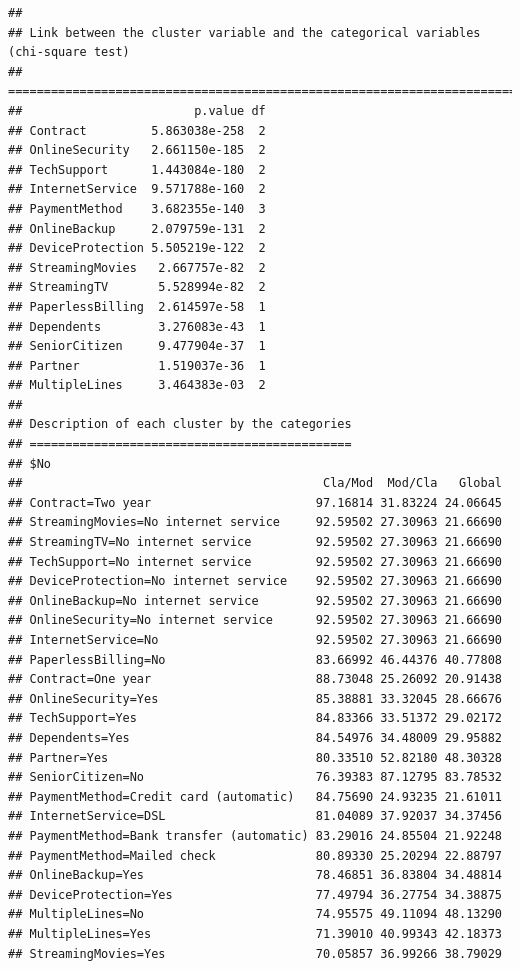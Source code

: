 \documentclass[
]{article}
\begin{document}
\begin{verbatim}
## 
## Link between the cluster variable and the categorical variables (chi-square test)
## =================================================================================
##                        p.value df
## Contract         5.863038e-258  2
## OnlineSecurity   2.661150e-185  2
## TechSupport      1.443084e-180  2
## InternetService  9.571788e-160  2
## PaymentMethod    3.682355e-140  3
## OnlineBackup     2.079759e-131  2
## DeviceProtection 5.505219e-122  2
## StreamingMovies   2.667757e-82  2
## StreamingTV       5.528994e-82  2
## PaperlessBilling  2.614597e-58  1
## Dependents        3.276083e-43  1
## SeniorCitizen     9.477904e-37  1
## Partner           1.519037e-36  1
## MultipleLines     3.464383e-03  2
## 
## Description of each cluster by the categories
## =============================================
## $No
##                                          Cla/Mod  Mod/Cla   Global
## Contract=Two year                       97.16814 31.83224 24.06645
## StreamingMovies=No internet service     92.59502 27.30963 21.66690
## StreamingTV=No internet service         92.59502 27.30963 21.66690
## TechSupport=No internet service         92.59502 27.30963 21.66690
## DeviceProtection=No internet service    92.59502 27.30963 21.66690
## OnlineBackup=No internet service        92.59502 27.30963 21.66690
## OnlineSecurity=No internet service      92.59502 27.30963 21.66690
## InternetService=No                      92.59502 27.30963 21.66690
## PaperlessBilling=No                     83.66992 46.44376 40.77808
## Contract=One year                       88.73048 25.26092 20.91438
## OnlineSecurity=Yes                      85.38881 33.32045 28.66676
## TechSupport=Yes                         84.83366 33.51372 29.02172
## Dependents=Yes                          84.54976 34.48009 29.95882
## Partner=Yes                             80.33510 52.82180 48.30328
## SeniorCitizen=No                        76.39383 87.12795 83.78532
## PaymentMethod=Credit card (automatic)   84.75690 24.93235 21.61011
## InternetService=DSL                     81.04089 37.92037 34.37456
## PaymentMethod=Bank transfer (automatic) 83.29016 24.85504 21.92248
## PaymentMethod=Mailed check              80.89330 25.20294 22.88797
## OnlineBackup=Yes                        78.46851 36.83804 34.48814
## DeviceProtection=Yes                    77.49794 36.27754 34.38875
## MultipleLines=No                        74.95575 49.11094 48.13290
## MultipleLines=Yes                       71.39010 40.99343 42.18373
## StreamingMovies=Yes                     70.05857 36.99266 38.79029

\end{verbatim}
\end{document}
